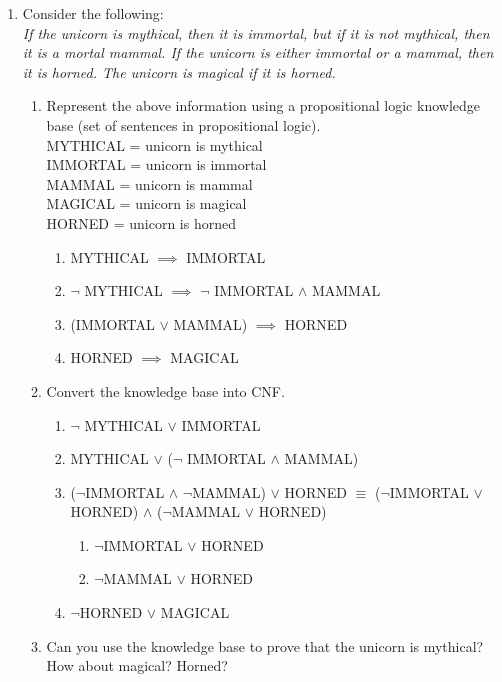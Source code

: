 \documentclass[10.5pt,letterpaper]{article}
\begin{document}
\begin{enumerate}[label=\textbf{Problem \arabic*.}]
\begin{itemize}
		\end{itemize}
		\item Consider the following:\\
		\textit{If the unicorn is mythical, then it is immortal, but if it is not mythical, then it is a mortal mammal. If the unicorn is either immortal or a mammal, then it is horned. The unicorn is magical if it is horned.}
			\begin{enumerate}[label=(\alph*)]
			\item Represent the above information using a propositional logic knowledge base (set of sentences in propositional logic).\\
			MYTHICAL = unicorn is mythical\\
			IMMORTAL = unicorn is immortal\\
			MAMMAL = unicorn is mammal\\
			MAGICAL = unicorn is magical\\
			HORNED = unicorn is horned
				\begin{enumerate}[label=\Roman*.]
					\item MYTHICAL $\implies$ IMMORTAL
					\item $\neg$ MYTHICAL $\implies$ $\neg$ IMMORTAL $\land$ MAMMAL
					\item (IMMORTAL $\lor$ MAMMAL) $\implies$ HORNED
					\item HORNED $\implies$ MAGICAL
				\end{enumerate}
			\item Convert the knowledge base into CNF.
				\begin{enumerate}[label=\Roman*.]
					\item $\neg$ MYTHICAL $\lor$ IMMORTAL
					\item MYTHICAL $\lor$ ($\neg$ IMMORTAL $\land$ MAMMAL)
					\item ($\neg$IMMORTAL $\land$ $\neg$MAMMAL) $\lor$ HORNED $\equiv$ ($\neg$IMMORTAL $\lor$ HORNED) $\land$ ($\neg$MAMMAL $\lor$ HORNED)
						\begin{enumerate}[label=III\alph*.]
						\item $\neg$IMMORTAL $\lor$ HORNED
						\item $\neg$MAMMAL $\lor$ HORNED
						\end{enumerate}
					\item $\neg$HORNED $\lor$ MAGICAL
				\end{enumerate}
			\item Can you use the knowledge base to prove that the unicorn is mythical? How about magical? Horned?

\end{enumerate}
\end{enumerate}
\end{document}
